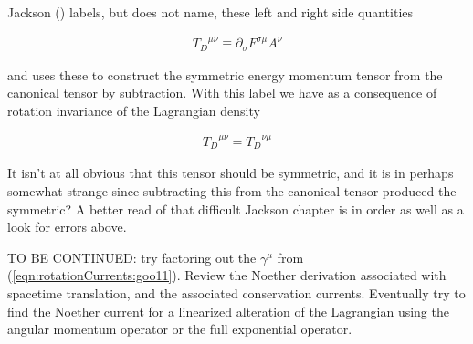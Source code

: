 Jackson (\cite{jackson1975cew}) labels, but does not name, these left and right side quantities

\begin{align}\label{eqn:rotationCurrents:goo13}
{T_D}^{\mu\nu} \equiv \partial_\sigma F^{\sigma\mu} A^\nu
\end{align}

and uses these to construct the symmetric energy momentum tensor from the canonical tensor by subtraction.  With this label we have as a consequence of rotation invariance of the Lagrangian density

\begin{align}\label{eqn:rotationCurrents:goo14}
{T_D}^{\mu\nu} = {T_D}^{\nu\mu}
\end{align}

It isn't at all obvious that this tensor should be symmetric, and it is in perhaps somewhat strange since subtracting this from the canonical tensor produced the symmetric?  A better read of that difficult Jackson chapter is in order as well as a look for errors above.

TO BE CONTINUED: try factoring out the $\gamma^\mu$ from (\ref{eqn:rotationCurrents:goo11}).  Review the Noether derivation associated with spacetime translation, and the associated conservation currents.  Eventually try to find the Noether current for a linearized alteration of the Lagrangian using the angular momentum operator or the full exponential operator.

\EndArticle
